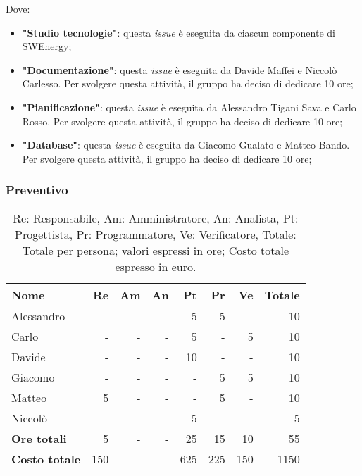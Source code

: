 Dove:
\begin{itemize}
	\item \textbf{"Studio tecnologie"}: questa \textit{issue} è eseguita da
	      ciascun componente di SWEnergy;

	\item \textbf{"Documentazione"}: questa \textit{issue} è eseguita da
	      Davide Maffei e Niccolò Carlesso. Per svolgere questa attività, il
	      gruppo ha deciso di dedicare 10 ore;

	\item \textbf{"Pianificazione"}: questa \textit{issue} è eseguita da
	      Alessandro Tigani Sava e Carlo Rosso. Per svolgere questa attività,
	      il gruppo ha deciso di dedicare 10 ore;

	\item \textbf{"Database"}: questa \textit{issue} è eseguita da
	      Giacomo Gualato e Matteo Bando. Per svolgere questa attività, il
	      gruppo ha deciso di dedicare 10 ore;
\end{itemize}

\subsubsection{Preventivo}

\begin{table}[H]
	\centering
	\begin{tabular}{l|r|r|r|r|r|r|r}
		\textbf{Nome}         & \textbf{Re} & \textbf{Am} & \textbf{An} & \textbf{Pt} & \textbf{Pr} & \textbf{Ve} & \textbf{Totale} \\
		\hline
		Alessandro            & -           & -           & -           & 5           & 5           & -           & 10              \\
		Carlo                 & -           & -           & -           & 5           & -           & 5           & 10              \\
		Davide                & -           & -           & -           & 10          & -           & -           & 10              \\
		Giacomo               & -           & -           & -           & -           & 5           & 5           & 10              \\
		Matteo                & 5           & -           & -           & -           & 5           & -           & 10              \\
		Niccolò               & -           & -           & -           & 5           & -           & -           & 5               \\
		\hline
		\textbf{Ore totali}   & 5           & -           & -           & 25          & 15          & 10          & 55              \\
		\textbf{Costo totale} & 150         & -           & -           & 625         & 225         & 150         & 1150
	\end{tabular}
	\caption{Re: Responsabile, Am: Amministratore, An: Analista, Pt: Progettista,
		Pr: Programmatore, Ve: Verificatore, Totale: Totale per persona; valori espressi in ore; Costo totale espresso in euro.}
\end{table}


